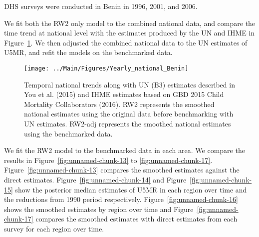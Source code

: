 \documentclass[12pt]{article}\usepackage[]{graphicx}\usepackage[]{color}
\newenvironment{knitrout}{}{} %
\begin{document}


DHS surveys were conducted in Benin in 1996, 2001, and 2006.

We fit both the RW2 only model to the combined national data, and compare the time trend at national level with the estimates produced by the UN and IHME in Figure~\ref{fig:unnamed-chunk-12}. We then adjusted the combined national data to the UN estimates of U5MR, and refit the models on the benchmarked data. 

\begin{knitrout}
\color{fgcolor}\begin{figure}[bht]

{\centering \texttt{[image: ../Main/Figures/Yearly\_national\_Benin]} 

}

\caption[Temporal national trends along with UN (B3) estimates described in You et al]{Temporal national trends along with UN (B3) estimates described in You et al. (2015) and IHME estimates based on GBD 2015 Child Mortality Collaborators (2016). RW2 represents the smoothed national estimates using the original data before benchmarking with UN estimates. RW2-adj represents the smoothed national estimates using the benchmarked data.}\label{fig:unnamed-chunk-12}
\end{figure}


\end{knitrout}
 

We fit the RW2 model to the benchmarked data in each area. 
We compare the results in Figure~\ref{fig:unnamed-chunk-13} to \ref{fig:unnamed-chunk-17}.
Figure~\ref{fig:unnamed-chunk-13} compares the smoothed estimates against the direct estimates. Figure~\ref{fig:unnamed-chunk-14} and Figure~\ref{fig:unnamed-chunk-15} show the posterior median estimates of U5MR in each region over time and the reductions from 1990 period respectively.
Figure~\ref{fig:unnamed-chunk-16} shows the smoothed estimates by region over time and Figure~\ref{fig:unnamed-chunk-17} compares the smoothed estimates with direct estimates from each survey for each region over time.


\end{document}
